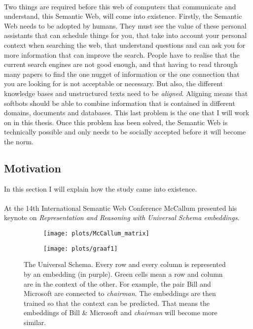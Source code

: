 \documentclass{article}
\begin{document}
 \paragraph{}
 Two things are required before this web of computers that communicate and understand, this Semantic Web, will come into existence.
 Firstly, the Semantic Web needs to be adopted by humans. They must see the value of these personal assistants that can schedule things for you, that take into account your personal context when searching the web, that understand questions and can ask you for more information that can improve the search. People have to realise that the current search engines are not good enough, and that having to read through many papers to find the one nugget of information or the one connection that you are looking for is not acceptable or necessary.
 But also, the different knowledge bases and unstructured texts need to be \emph{aligned}. Aligning means that softbots should be able to combine information that is contained in different domains, documents and databases. This last problem is the one that I will work on in this thesis. Once this problem has been solved, the Semantic Web is technically possible and only needs to be socially accepted before it will become the norm\cite{microformats}.
 \subsection{Motivation}
 In this section I will explain how the study came into existence.
 \paragraph{}
 At the 14th International Semantic Web Conference McCallum presented his keynote on \emph{Representation and Reasoning with Universal Schema embeddings}\cite{mccallumweblecture}. 
 
 \begin{figure}[H]
 \centering
 \begin{subfigure}{.475\textwidth}
 \texttt{[image: plots/McCallum\_matrix]}
 \end{subfigure}
 \begin{subfigure}{0.475\textwidth}
 \texttt{[image: plots/graaf1]}
 \end{subfigure}
 \caption[Universal Schema]{The Universal Schema. Every row and every column is represented by an embedding (in purple). Green cells mean a row and column are in the context of the other. For example, the pair Bill and Microsoft are connected to \emph{chairman}.
 The embeddings are then trained so that the context can be predicted. That means the embeddings of Bill \& Microsoft and \emph{chairman} will become more similar.}
 \label{McCallum_matrix}
 \end{figure}
\end{document}
